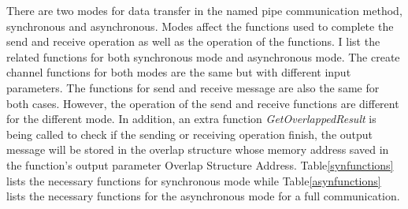 There are two modes for data transfer in the named pipe communication method, synchronous and asynchronous.  Modes affect the functions used to complete the send and receive operation as well as the operation of the functions. I list the related functions for both synchronous mode and asynchronous mode. The create channel functions for both modes are the same but with different input parameters. The functions for send and receive message are also the same for both cases. However, the operation of the send and receive functions are different for the different mode. In addition, an extra function \textit{GetOverlappedResult} is being called to check if the sending or receiving operation finish, the output message will be stored in the overlap structure whose memory address saved in the function's output parameter Overlap Structure Address. Table\ref{synfunctions} lists the necessary functions for synchronous mode while Table\ref{asynfunctions} lists the necessary functions for the asynchronous mode for a full communication.

